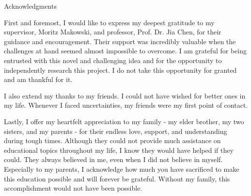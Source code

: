\thispagestyle{empty}

\vspace*{20mm}

\begin{center}
    { Acknowledgments}
\end{center}

First and foremost, I would like to express my deepest gratitude to my supervisor, Moritz Makowski, and professor, Prof. Dr. Jia Chen, for their guidance and encouragement.
Their support was incredibly valuable when the challenges at hand seemed almost impossible to overcome.
I am grateful for being entrusted with this novel and challenging idea and for the opportunity to independently research this project.
I do not take this opportunity for granted and am thankful for it.

I also extend my thanks to my friends.
I could not have wished for better ones in my life.
Whenever I faced uncertainties, my friends were my first point of contact.

Lastly, I offer my heartfelt appreciation to my family - my elder brother, my two sisters, and my parents - for their endless love, support, and understanding during tough times.
Although they could not provide much assistance on educational topics throughout my life, I know they would have helped if they could.
They always believed in me, even when I did not believe in myself.
Especially to my parents, I acknowledge how much you have sacrificed to make this education possible and will forever be grateful.
Without my family, this accomplishment would not have been possible.

\vspace{10mm}

\cleardoublepage{}
